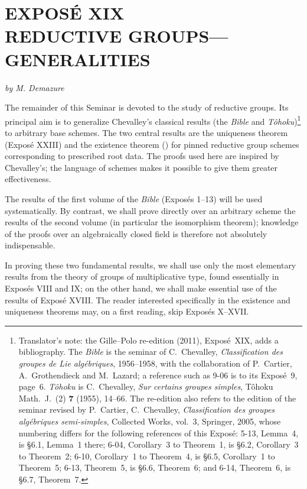 
\chapter*{EXPOSÉ XIX\\[0.4em]
REDUCTIVE GROUPS---GENERALITIES}

\begin{center}
\textit{by M. Demazure}
\end{center}

\begingroup
\renewcommand{\thefootnote}{0}%
\endgroup

The remainder of this Seminar is devoted to the study of reductive groups.  Its
principal aim is to generalize Chevalley's classical results (the
\emph{Bible} and \emph{Tôhoku})\footnote{Translator's note: the Gille--Polo re-edition (2011), Exposé~XIX, adds a bibliography.
The \emph{Bible} is the seminar of C.~Chevalley, \textit{Classification
des groupes de Lie algébriques}, 1956--1958, with the collaboration of
P.~Cartier, A.~Grothendieck and M.~Lazard; a reference such as 9-06 is to
its Exposé~9, page~6. \emph{Tôhoku} is C.~Chevalley, \textit{Sur certains
groupes simples}, Tôhoku Math.\ J.\ (2) \textbf{7} (1955), 14--66. The
re-edition also refers to the edition of the seminar revised by
P.~Cartier, C.~Chevalley, \textit{Classification des groupes algébriques
semi-simples}, Collected Works, vol.~3, Springer, 2005, whose numbering
differs for the following references of this Exposé: 5-13, Lemma~4, is
§6.1, Lemma~1 there; 6-04, Corollary~3 to Theorem~1, is §6.2,
Corollary~3 to Theorem~2; 6-10, Corollary~1 to Theorem~4, is §6.5,
Corollary~1 to Theorem~5; 6-13, Theorem~5, is §6.6, Theorem~6; and 6-14,
Theorem~6, is §6.7, Theorem~7.}
to arbitrary base schemes.  The two central results are the uniqueness theorem
(Exposé XXIII) and the existence theorem
() for pinned reductive group schemes corresponding to
prescribed root data.  The proofs used here are inspired by Chevalley's; the
language of schemes makes it possible to give them greater effectiveness.

The results of the first volume of the \emph{Bible} (Exposés 1--13) will be
used systematically.  By contrast, we shall prove directly over an arbitrary
scheme the results of the second volume (in particular the isomorphism
theorem); knowledge of the proofs over an algebraically closed field is
therefore not absolutely indispensable.

In proving these two fundamental results, we shall use only the most elementary
results from the theory of groups of multiplicative type, found essentially in
Exposés VIII and IX; on the other hand, we shall make essential use of the
results of Exposé XVIII.
The reader interested specifically in the existence and uniqueness theorems
may, on a first reading, skip Exposés X--XVII.

